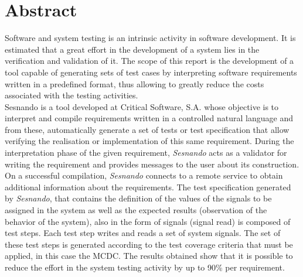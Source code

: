 \chapter*{Abstract}
\label{ch:abstract}

Software and system testing is an intrinsic activity in software development. It is estimated that a great effort in the development of a system lies in the verification and validation of it. The scope of this report is the development of a tool capable of generating sets of test cases by interpreting software requirements written in a predefined format, thus allowing to greatly reduce the costs associated with the testing activities.\\
Sesnando is a tool developed at Critical Software, S.A. whose objective is to interpret and compile requirements written in a controlled natural language and from these, automatically generate a set of tests or test specification that allow verifying the realisation or implementation of this same requirement. During the interpretation phase of the given requirement, \textit{Sesnando} acts as a validator for writing the requirement and provides messages to the user about its construction. On a successful compilation, \textit{Sesnando} connects to a remote service to obtain additional information about the requirements. The test specification generated by \textit{Sesnando}, that contains the definition of the values of the signals to be assigned in the system as well as the expected results (observation of the behavior of the system), also in the form of signals (signal read) is composed of test steps. Each test step writes and reads a set of system signals. The set of these test steps is generated according to the test coverage criteria that must be applied, in this case the MCDC. The results obtained show that it is possible to reduce the effort in the system testing activity by up to 90\% per requirement.




